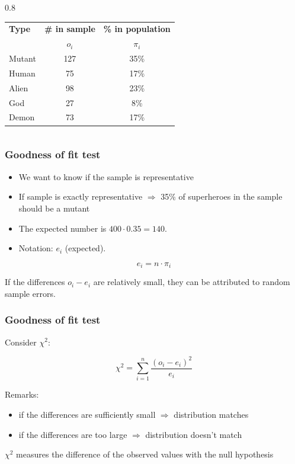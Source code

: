 \documentclass{beamer}
\begin{document}
\begin{frame}
\begin{columns}
    \begin{column} { 0.8 \textwidth}
    \begin{table}
\begin{tabular}{lcc}
	\toprule
	\textbf{Type} & \textbf{\# in sample} & \textbf{\% in population} \\
	              & $o_i$              & $\pi_i$                     \\ \midrule
	Mutant        & 127                   & 35\%                      \\
	Human         & 75                    & 17\%                      \\
	Alien         & 98                    & 23\%                      \\
	God           & 27                    & 8\%                       \\
	Demon         & 73                    & 17\%                      \\ \bottomrule
\end{tabular}
\end{table}
    \end{column}
  \end{columns}
\end{frame}

\begin{frame}
  \frametitle{Goodness of fit test}
  
  \begin{itemize}
    \item We want to know if the sample is representative
    \item If sample is exactly representative $\Rightarrow$ 35\% of superheroes in the sample should be a mutant
    \item The expected number is $400 \cdot 0.35 = 140$.
    \item Notation: $e_i$ (expected).
  \end{itemize}

  \[ e_i = n \cdot \pi_i \]
  
  If the differences $o_i - e_i$ are relatively small, they can be attributed to random sample errors.
\end{frame}

\begin{frame}
  \frametitle{Goodness of fit test}
  Consider $\chi^{2}$:

  \[ \chi^{2} = \sum_{i=1}^{n} \frac{(o_{i} - e_{i})^{2}}{e_{i}} \]

  Remarks:
  \begin{itemize}
    \item if the differences are sufficiently small $\Rightarrow$ distribution matches
    \item if the differences are too large $\Rightarrow$ distribution doesn't match
  \end{itemize}
  
  $\chi^{2}$ measures the difference of the observed values with the null hypothesis
\end{frame}
\end{document}
